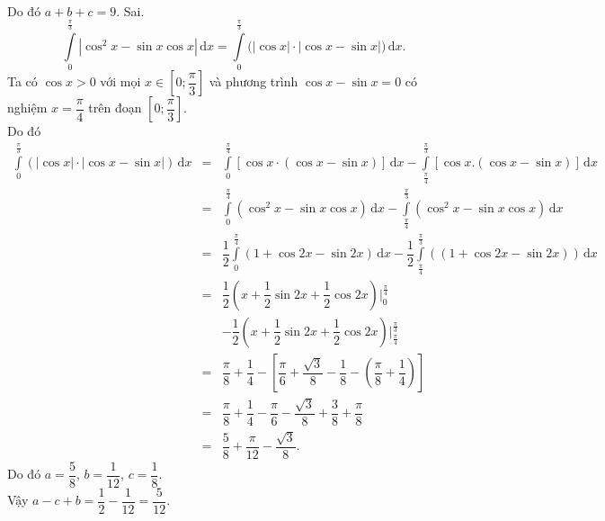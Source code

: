 \begin{ex}
{\begin{itemchoice}
\begin{eqnarray*}
\end{eqnarray*}
Do đó $a+b+c=9$.
\itemch Sai. $$
\displaystyle\int\limits_0^{\tfrac{\pi}{3}}\left|\cos^2 x-\sin x \cos x\right|\mathrm{\,d}x=\displaystyle\int\limits_0^{\tfrac{\pi}{3}}\big(|\cos x|\cdot|\cos x-\sin x|\big)\mathrm{\,d}x.
$$
Ta có $\cos x > 0$ với mọi $x \in\left[0; \dfrac{\pi}{3}\right]$ và phương trình $\cos x-\sin x=0$ có nghiệm $x=\dfrac{\pi}{4}$ trên đoạn $\left[0; \dfrac{\pi}{3}\right]$.\\
Do đó
\allowdisplaybreaks
\begin{eqnarray*}
\displaystyle\int\limits_0^{\tfrac{\pi}{3}}(|\cos x|\cdot|\cos x-\sin x|)\mathrm{\,d} x&=&\displaystyle\int\limits_0^{\tfrac{\pi}{4}}[\cos x \cdot(\cos x-\sin x)]\mathrm{\,d} x-\displaystyle\int\limits_{\tfrac{\pi}{4}}^{\tfrac{\pi}{3}}[\cos x.(\cos x-\sin x)]\mathrm{\,d}x\\
&=&\displaystyle\int\limits_0^{\tfrac{\pi}{4}}\left(\cos ^2x-\sin x \cos x\right)\mathrm{\,d} x-\displaystyle\int\limits_{\tfrac{\pi}{4}}^{\tfrac{\pi}{3}}\left(\cos ^2x-\sin x \cos x\right)\mathrm{\,d}x\\
&=&\dfrac{1}{2} \displaystyle\int\limits_0^{\tfrac{\pi}{4}}(1+\cos 2x-\sin 2x)\mathrm{\,d}x-\dfrac{1}{2} \displaystyle\int\limits_{\tfrac{\pi}{4}}^{\tfrac{\pi}{3}}((1+\cos 2x-\sin 2x))\mathrm{\,d}x\\
&=&\dfrac{1}{2}\left(x+\dfrac{1}{2} \sin 2x+\dfrac{1}{2} \cos 2x\right)\bigg|_0 ^{\tfrac{\pi}{4}}\\&&-\dfrac{1}{2}\left(x+\dfrac{1}{2} \sin 2x+\dfrac{1}{2} \cos 2x\right)\bigg|_{\tfrac{\pi}{4}} ^{\tfrac{\pi}{3}}\\
&=&\dfrac{\pi}{8}+\dfrac{1}{4}-\left[\dfrac{\pi}{6}+\dfrac{\sqrt{3}}{8}-\dfrac{1}{8}-\left(\dfrac{\pi}{8}+\dfrac{1}{4}\right)\right]\\&=&\dfrac{\pi}{8}+\dfrac{1}{4}-\dfrac{\pi}{6}-\dfrac{\sqrt{3}}{8}+\dfrac{3}{8}+\dfrac{\pi}{8}\\&=&\dfrac{5}{8}+\dfrac{\pi}{12}-\dfrac{\sqrt{3}}{8}.
\end{eqnarray*}
Do đó $a=\dfrac{5}{8}$, $b=\dfrac{1}{12}$, $c=\dfrac{1}{8}$.\\ Vậy $a-c+b=\dfrac{1}{2}-\dfrac{1}{12}=\dfrac{5}{12}$.
\end{itemchoice}
}
\end{ex}
